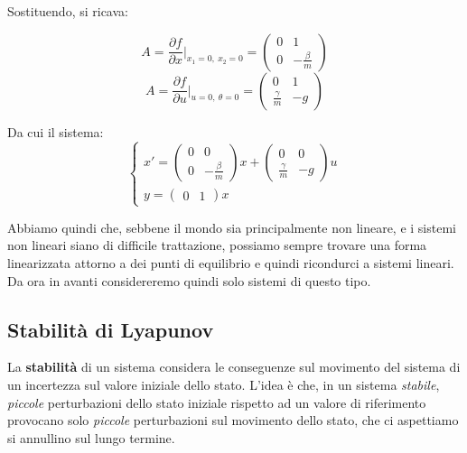 \documentclass[a4paper,11pt]{article}
\begin{document}
Sostituendo, si ricava:

$$
A = \frac{\partial f}{\partial x} \Bigg|_{x_1 = 0, \ x_2 = 0} = \begin{pmatrix}
	0 & 1 \\ 
	0 & -\frac{\beta}{m}
\end{pmatrix}
$$
$$
A = \frac{\partial f}{\partial u} \Bigg|_{u = 0, \ \theta = 0} = \begin{pmatrix}
	0 & 1 \\ 
	\frac{\gamma}{m} & -g
\end{pmatrix}
$$

Da cui il sistema:
\[
	\begin{cases}			
x' = \begin{pmatrix}
	0 & 0 \\ 
	0 & -\frac{\beta}{m}
\end{pmatrix} x + \begin{pmatrix}
	0 & 0 \\ 
	\frac{\gamma}{m} & -g
\end{pmatrix} u \\ 
y = \begin{pmatrix}
	0 & 1
\end{pmatrix} x
	\end{cases}
\]

\par\smallskip

Abbiamo quindi che, sebbene il mondo sia principalmente non lineare, e i sistemi non lineari siano di difficile trattazione, possiamo sempre trovare una forma linearizzata attorno a dei punti di equilibrio e quindi ricondurci a sistemi lineari.
Da ora in avanti considereremo quindi solo sistemi di questo tipo.

\subsection{Stabilità di Lyapunov}
La \textbf{stabilità} di un sistema considera le conseguenze sul movimento del sistema di un incertezza sul valore iniziale dello stato.
L'idea è che, in un sistema \textit{stabile}, \textit{piccole} perturbazioni dello stato iniziale rispetto ad un valore di riferimento provocano solo \textit{piccole} perturbazioni sul movimento dello stato, che ci aspettiamo si annullino sul lungo termine.
\end{document}

